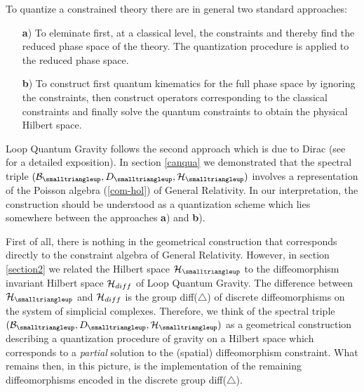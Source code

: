 \documentclass[12pt]{article}
\def\cb{{\cal B}}
\def\ch{{\cal H}}
\begin{document}
To quantize a constrained theory there are in general two standard approaches:
\begin{itemize}
\item[{\bf a})]
To eleminate first, at a classical level, the constraints and thereby find the reduced phase space of the theory. The quantization procedure is applied to the reduced phase space.
\item[{\bf b})] 
To construct first quantum kinematics for the full phase space by ignoring the constraints, then construct operators corresponding to the classical constraints and finally solve the quantum constraints to obtain the physical Hilbert space.
\end{itemize}
Loop Quantum Gravity follows the second approach which is due to Dirac (see \cite{Henneaux:1992ig} for a detailed exposition). In section \ref{canqua} we demonstrated that the spectral triple $(\cb_{\smalltriangleup},D_{\smalltriangleup},\ch_\smalltriangleup)$ involves a representation of the Poisson algebra (\ref{com-hol}) of General Relativity. In our interpretation, the construction should be understood as a quantization scheme which lies somewhere between the approaches {\bf a}) and {\bf b}). 



First of all, there is nothing in the geometrical construction that corresponds directly to the constraint algebra of General Relativity. However, in section \ref{section2} we related the Hilbert space $\ch_{\smalltriangleup}$ to the diffeomorphism invariant Hilbert space $\ch_{diff}$ of Loop Quantum Gravity. The difference between $\ch_{\smalltriangleup}$ and $\ch_{diff}$ is the group diff($\triangle$) of discrete diffeomorphisms on the system of simplicial complexes. Therefore, we think of the spectral triple $(\cb_{\smalltriangleup},D_{\smalltriangleup},\ch_\smalltriangleup)$ as a geometrical construction describing a quantization procedure of gravity on a Hilbert space which corresponds to a {\it partial} solution to the (spatial) diffeomorphism constraint. What remains then, in this picture, is the implementation of the remaining diffeomorphisms encoded in the discrete group diff($\triangle$).
\end{document}
